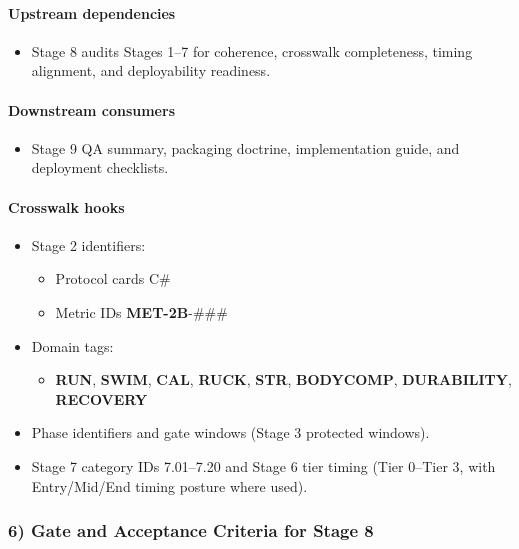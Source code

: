 \documentclass[10pt]{article}
\begin{document}
\paragraph*{Upstream dependencies}

\begin{itemize}
\item Stage 8 audits Stages 1–7 for coherence, crosswalk completeness, timing alignment, and deployability readiness.
\end{itemize}

\paragraph*{Downstream consumers}

\begin{itemize}
\item Stage 9 QA summary, packaging doctrine, implementation guide, and deployment checklists.
\end{itemize}

\paragraph*{Crosswalk hooks}

\begin{itemize}
\item Stage 2 identifiers:
  \begin{itemize}
  \item Protocol cards C\#
  \item Metric IDs \textbf{MET-2B}-\#\#\#
  \end{itemize}
\item Domain tags:
  \begin{itemize}
  \item \textbf{RUN}, \textbf{SWIM}, \textbf{CAL}, \textbf{RUCK}, \textbf{STR}, \textbf{BODYCOMP}, \textbf{DURABILITY}, \textbf{RECOVERY}
  \end{itemize}
\item Phase identifiers and gate windows (Stage 3 protected windows).
\item Stage 7 category IDs 7.01–7.20 and Stage 6 tier timing (Tier 0–Tier 3, with Entry/Mid/End timing posture where used).
\end{itemize}

\subsubsection*{6) Gate and Acceptance Criteria for Stage 8}
\end{document}

